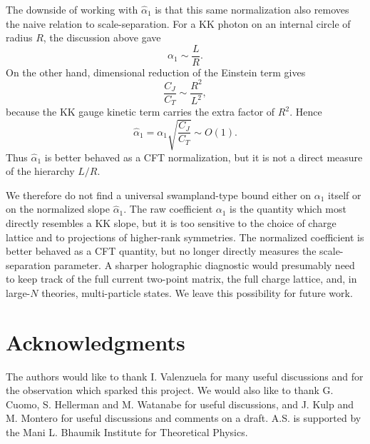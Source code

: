 \documentclass[a4paper,11pt]{article}
\begin{document}
The downside of working with $\hat\alpha_1$ is that this same normalization also removes the naive relation to scale-separation. For a KK photon on an internal circle of radius $R$, the discussion above gave
\begin{equation}
  \alpha_1\sim \frac{L}{R}.
\end{equation}
On the other hand, dimensional reduction of the Einstein term gives
\begin{equation}
  \frac{C_J}{C_T} \sim \frac{R^2}{L^2},
\end{equation}
because the KK gauge kinetic term carries the extra factor of $R^2$. Hence
\begin{equation}
  \widehat\alpha_1 = \alpha_1\sqrt{\frac{C_J}{C_T}} \sim O(1).
\end{equation}
Thus $\widehat\alpha_1$ is better behaved as a CFT normalization, but it is not a direct measure of the hierarchy $L/R$.

We therefore do not find a universal swampland-type bound either on $\alpha_1$ itself or on the normalized slope $\widehat\alpha_1$. The raw coefficient $\alpha_1$ is the quantity which most directly resembles a KK slope, but it is too sensitive to the choice of charge lattice and to projections of higher-rank symmetries. The normalized coefficient is better behaved as a CFT quantity, but no longer directly measures the scale-separation parameter. A sharper holographic diagnostic would presumably need to keep track of the full current two-point matrix, the full charge lattice, and, in large-$N$ theories, multi-particle states. We leave this
possibility for future work.

\section*{Acknowledgments}

The authors would like to thank I. Valenzuela for many useful discussions and for the observation which sparked this project. We would also like to thank G. Cuomo, S. Hellerman and M. Watanabe for useful discussions, and J. Kulp and M. Montero for useful discussions and comments on a draft. A.S. is supported by the Mani L. Bhaumik Institute for Theoretical Physics. 


\newpage
\end{document}
